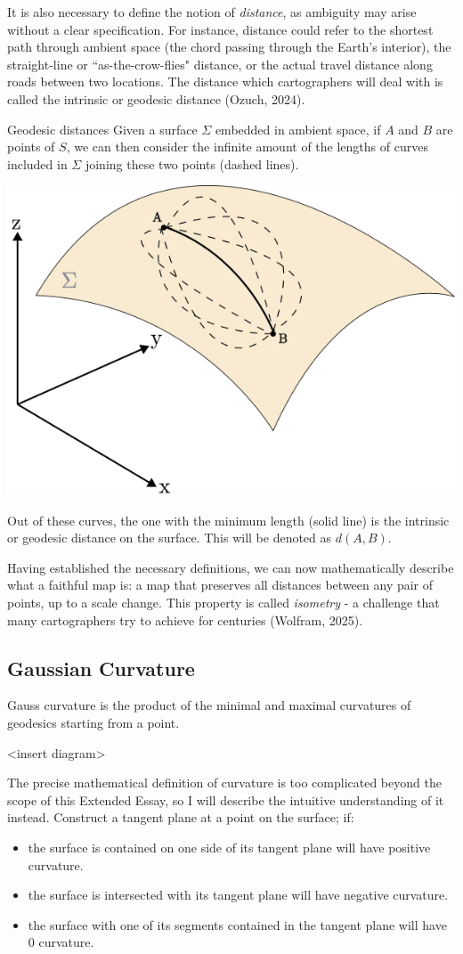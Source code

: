 It is also necessary to define the notion of \textit{distance}, as ambiguity may arise without a clear 
specification. For instance, distance could refer to the shortest path through ambient space (the chord 
passing through the Earth's interior), the straight-line or ``as-the-crow-flies" distance, or the actual travel 
distance along roads between two locations. The distance which cartographers will deal with is called the 
intrinsic or geodesic distance (Ozuch, 2024). 
\begin{definition}{Geodesic distances}
    Given a surface $\Sigma$ embedded in ambient space, if $A$ and $B$ are points of $S$, we can then consider 
    the infinite amount of the lengths of curves included in $\Sigma$ joining these two points (dashed lines). 
    \begin{center}
        \includegraphics[width=0.55\linewidth]
        {figures/distance.png}
    \end{center}
    Out of these curves, the one with the minimum length (solid line) is the intrinsic or geodesic distance on the surface. 
    This will be denoted as $d(A,B)$.
\end{definition}
Having established the necessary definitions, we can now mathematically describe what a faithful map is: a map that
preserves all distances between any pair of points, up to a scale change. This property is called \textit{isometry} 
- a challenge that many cartographers try to achieve for centuries (Wolfram, 2025). 

\pagebreak
\subsection{Gaussian Curvature}
\vspace*{-10pt}
Gauss curvature is the product of the minimal and maximal curvatures of geodesics starting from a point.

<insert diagram>

The precise mathematical definition of curvature is too complicated beyond the scope of this Extended Essay, so I will 
describe the intuitive understanding of it instead. Construct a tangent plane at a point on the surface; if:
\begin{itemize}
    \item the surface is contained on one side of its tangent plane will have positive curvature.
    \item the surface is intersected with its tangent plane will have negative curvature.
    \item the surface with one of its segments contained in the tangent plane will have 0 curvature. 
\end{itemize}

